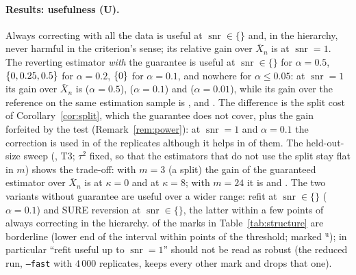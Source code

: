 \documentclass[10pt,a4paper]{article}
\theoremstyle{plain}
\theoremstyle{definition}
\theoremstyle{remark}
\DeclareMathOperator{\snr}{snr}
\begin{document}
\paragraph{Results: usefulness (U).}
Always correcting with all the data is useful at $\snr\in\{$\UsefulAlways$\}$ and, in the hierarchy, never harmful in the criterion's sense; its relative gain over $\bar X_n$ is \SOneAlwaysGain{} at $\snr=1$. The reverting estimator \emph{with} the guarantee is useful at $\snr\in\{$\UsefulRevHalf$\}$ for $\alpha=0.5$, $\{0, 0.25, 0.5\}$ for $\alpha=0.2$, $\{0\}$ for $\alpha=0.1$, and nowhere for $\alpha\le0.05$: at $\snr=1$ its gain over $\bar X_n$ is \SOneRevHalfGain{} ($\alpha=0.5$), \SOneRevTenGain{} ($\alpha=0.1$) and \SOneRevOneGain{} ($\alpha=0.01$), while its gain over the reference on the same estimation sample is \SOneRevHalfGainE, \SOneRevTenGainE{} and \SOneRevOneGainE. The difference is the split cost of Corollary~\ref{cor:split}, which the guarantee does not cover, plus the gain forfeited by the test (Remark~\ref{rem:power}): at $\snr=1$ and $\alpha=0.1$ the correction is used in \SOneRevTenAcc{} of the replicates although it helps in \SOneAlwaysEHelp{} of them. The held-out-size sweep (, T3; $\tau^2$ fixed, so that the estimators that do not use the split stay flat in $m$) shows the trade-off: with $m=3$ (a \MThreeSplit{} split) the gain of the guaranteed estimator over $\bar X_n$ is \MThreeZeroRevGain{} at $\kappa=0$ and \MThreeEightRevGain{} at $\kappa=8$; with $m=24$ it is \MTwentyFourZeroRevGain{} and \MTwentyFourEightRevGain. The two variants without guarantee are useful over a wider range: refit at $\snr\in\{$\UsefulRefitTen$\}$ ($\alpha=0.1$) and SURE reversion at $\snr\in\{$\UsefulSure$\}$, the latter within a few points of always correcting in the hierarchy. \NBorderline{} of the marks in Table~\ref{tab:structure} are borderline (lower end of the interval within \BorderPts{} points of the threshold; marked $^{\mathrm u}$); in particular ``refit useful up to $\snr=1$'' should not be read as robust (the reduced run, \texttt{--fast} with $4\,000$ replicates, keeps every other mark and drops that one).
\end{document}
